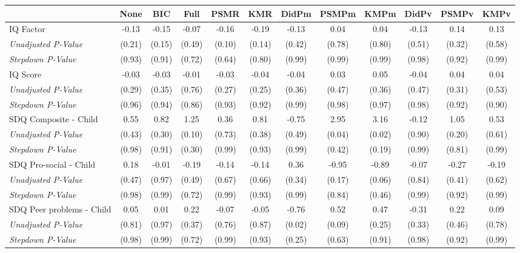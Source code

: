 \begin{tabular}{l c c c c c c c c c c c}
\toprule
 & None & BIC & Full & PSMR & KMR & DidPm & PSMPm & KMPm & DidPv & PSMPv & KMPv \\
\midrule
IQ Factor & -0.13 & -0.15 & -0.07 & -0.16 & -0.19 & -0.13 & 0.04 & 0.04 & -0.13 & 0.14 & 0.13 \\
\quad \textit{Unadjusted P-Value} & (0.21) & (0.15) & (0.49) & (0.10) & (0.14) & (0.42) & (0.78) & (0.80) & (0.51) & (0.32) & (0.58) \\
\quad \textit{Stepdown P-Value} & (0.93) & (0.91) & (0.72) & (0.64) & (0.80) & (0.99) & (0.99) & (0.99) & (0.98) & (0.92) & (0.99) \\
IQ Score & -0.03 & -0.03 & -0.01 & -0.03 & -0.04 & -0.04 & 0.03 & 0.05 & -0.04 & 0.04 & 0.04 \\
\quad \textit{Unadjusted P-Value} & (0.29) & (0.35) & (0.76) & (0.27) & (0.25) & (0.36) & (0.47) & (0.36) & (0.47) & (0.31) & (0.53) \\
\quad \textit{Stepdown P-Value} & (0.96) & (0.94) & (0.86) & (0.93) & (0.92) & (0.99) & (0.98) & (0.97) & (0.98) & (0.92) & (0.90) \\
SDQ Composite - Child & 0.55 & 0.82 & 1.25 & 0.36 & 0.81 & -0.75 & 2.95 & 3.16 & -0.12 & 1.05 & 0.53 \\
\quad \textit{Unadjusted P-Value} & (0.43) & (0.30) & (0.10) & (0.73) & (0.38) & (0.49) & (0.04) & (0.02) & (0.90) & (0.20) & (0.61) \\
\quad \textit{Stepdown P-Value} & (0.98) & (0.91) & (0.30) & (0.99) & (0.93) & (0.99) & (0.42) & (0.19) & (0.99) & (0.81) & (0.99) \\
SDQ Pro-social - Child & 0.18 & -0.01 & -0.19 & -0.14 & -0.14 & 0.36 & -0.95 & -0.89 & -0.07 & -0.27 & -0.19 \\
\quad \textit{Unadjusted P-Value} & (0.47) & (0.97) & (0.49) & (0.67) & (0.66) & (0.34) & (0.17) & (0.06) & (0.84) & (0.41) & (0.62) \\
\quad \textit{Stepdown P-Value} & (0.98) & (0.99) & (0.72) & (0.99) & (0.93) & (0.99) & (0.84) & (0.46) & (0.99) & (0.92) & (0.99) \\
SDQ Peer problems - Child & 0.05 & 0.01 & 0.22 & -0.07 & -0.05 & -0.76 & 0.52 & 0.47 & -0.31 & 0.22 & 0.09 \\
\quad \textit{Unadjusted P-Value} & (0.81) & (0.97) & (0.37) & (0.76) & (0.87) & (0.02) & (0.09) & (0.25) & (0.33) & (0.46) & (0.78) \\
\quad \textit{Stepdown P-Value} & (0.98) & (0.99) & (0.72) & (0.99) & (0.93) & (0.25) & (0.63) & (0.91) & (0.98) & (0.92) & (0.99) \\

\end{tabular}
